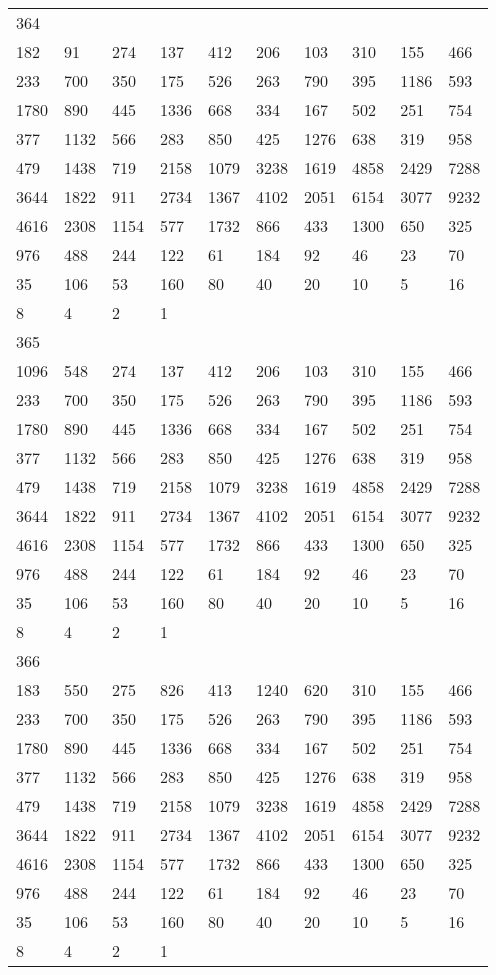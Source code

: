 \begin{longtable}{*{10}{l}}
364&&&&&&&&&\\
182& 91& 274& 137& 412& 206& 103& 310& 155& 466\\
233& 700& 350& 175& 526& 263& 790& 395& 1186& 593\\
1780& 890& 445& 1336& 668& 334& 167& 502& 251& 754\\
377& 1132& 566& 283& 850& 425& 1276& 638& 319& 958\\
479& 1438& 719& 2158& 1079& 3238& 1619& 4858& 2429& 7288\\
3644& 1822& 911& 2734& 1367& 4102& 2051& 6154& 3077& 9232\\
4616& 2308& 1154& 577& 1732& 866& 433& 1300& 650& 325\\
976& 488& 244& 122& 61& 184& 92& 46& 23& 70\\
35& 106& 53& 160& 80& 40& 20& 10& 5& 16\\
8& 4& 2& 1& \\

365&&&&&&&&&\\
1096& 548& 274& 137& 412& 206& 103& 310& 155& 466\\
233& 700& 350& 175& 526& 263& 790& 395& 1186& 593\\
1780& 890& 445& 1336& 668& 334& 167& 502& 251& 754\\
377& 1132& 566& 283& 850& 425& 1276& 638& 319& 958\\
479& 1438& 719& 2158& 1079& 3238& 1619& 4858& 2429& 7288\\
3644& 1822& 911& 2734& 1367& 4102& 2051& 6154& 3077& 9232\\
4616& 2308& 1154& 577& 1732& 866& 433& 1300& 650& 325\\
976& 488& 244& 122& 61& 184& 92& 46& 23& 70\\
35& 106& 53& 160& 80& 40& 20& 10& 5& 16\\
8& 4& 2& 1& \\

366&&&&&&&&&\\
183& 550& 275& 826& 413& 1240& 620& 310& 155& 466\\
233& 700& 350& 175& 526& 263& 790& 395& 1186& 593\\
1780& 890& 445& 1336& 668& 334& 167& 502& 251& 754\\
377& 1132& 566& 283& 850& 425& 1276& 638& 319& 958\\
479& 1438& 719& 2158& 1079& 3238& 1619& 4858& 2429& 7288\\
3644& 1822& 911& 2734& 1367& 4102& 2051& 6154& 3077& 9232\\
4616& 2308& 1154& 577& 1732& 866& 433& 1300& 650& 325\\
976& 488& 244& 122& 61& 184& 92& 46& 23& 70\\
35& 106& 53& 160& 80& 40& 20& 10& 5& 16\\
8& 4& 2& 1& \\


\end{longtable}
